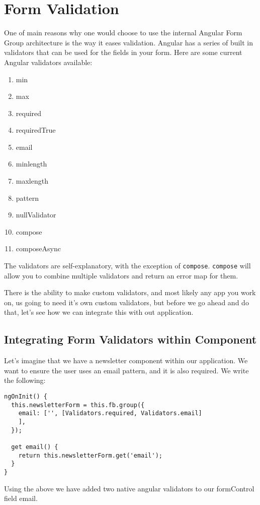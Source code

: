 \chapter{ Form Validation }

One of main reasons why one would choose to use the internal Angular Form 
Group architecture is the way it eases validation. Angular has a series 
of built in validators that can be used for the fields in your form. Here are some current Angular validators available:

\begin{enumerate}
  \item min
  \item max
  \item required
  \item requiredTrue
  \item email
  \item minlength
  \item maxlength
  \item pattern
  \item nullValidator
  \item compose
  \item composeAsync
\end{enumerate}

The validators are self-explanatory, with the exception of \lstinline{compose}. \lstinline{compose} will allow you to combine multiple validators and return an error map for them. 

There is the ability to make custom validators, and most likely any app you work on, us going to need it's own custom validators, but before we go ahead and do that, let's see how we can integrate this with out application. 

\section{Integrating Form Validators within Component}
Let's imagine that we have a newsletter component within our application. We want to ensure the user uses an email pattern, and it is also required. We write the following: 
\begin{lstlisting}
ngOnInit() {
  this.newsletterForm = this.fb.group({
    email: ['', [Validators.required, Validators.email]
    ],
  });

  get email() {
    return this.newsletterForm.get('email');
  }
}
\end{lstlisting}

Using the above we have added two native angular validators to our formControl field email. 

